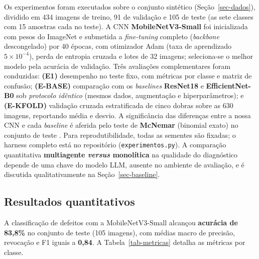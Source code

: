 \documentclass[
	article,			%
	11pt,				%
	oneside,			%
	a4paper,			%
	english,			%
	brazilian,			%
	sumario=tradicional
	]{abntex2}
\begin{document}
Os experimentos foram executados sobre o conjunto sintético (Seção~\ref{sec-dados}),
dividido em 434 imagens de treino, 91 de validação e 105 de teste (as sete classes
com 15 amostras cada no teste). A CNN \textbf{MobileNetV3-Small} foi inicializada com
pesos do ImageNet e submetida a \textit{fine-tuning} completo (\textit{backbone}
descongelado) por 40 épocas, com otimizador Adam (taxa de aprendizado
$5\times10^{-4}$), perda de entropia cruzada e lotes de 32 imagens; seleciona-se o
melhor modelo pela acurácia de validação. Três avaliações complementares foram
conduzidas: \textbf{(E1)} desempenho no teste fixo, com métricas por classe e matriz
de confusão; \textbf{(E-BASE)} comparação com os \textit{baselines} \textbf{ResNet18}
e \textbf{EfficientNet-B0} sob \emph{protocolo idêntico} (mesmos dados, augmentação e
hiperparâmetros); e \textbf{(E-KFOLD)} validação cruzada estratificada de cinco
dobras sobre as 630 imagens, reportando média e desvio. A significância das
diferenças entre a nossa CNN e cada \textit{baseline} é aferida pelo teste de
\textbf{McNemar} (binomial exato) no conjunto de teste \cite{dietterich1998tests}.
Para reprodutibilidade, todas as sementes são fixadas; o harness completo está no
repositório (\texttt{experimentos.py}). A comparação quantitativa \textbf{multiagente
\textit{versus} monolítica} na qualidade do diagnóstico depende de uma chave do
modelo LLM, ausente no ambiente de avaliação, e é discutida qualitativamente na
Seção~\ref{sec-baseline}.

\subsection{Resultados quantitativos}

A classificação de defeitos com a MobileNetV3-Small alcançou \textbf{acurácia de
83,8\%} no conjunto de teste (105 imagens), com médias macro de precisão, revocação e
F1 iguais a \textbf{0,84}. A Tabela~\ref{tab-metricas} detalha as métricas por classe.
\end{document}
